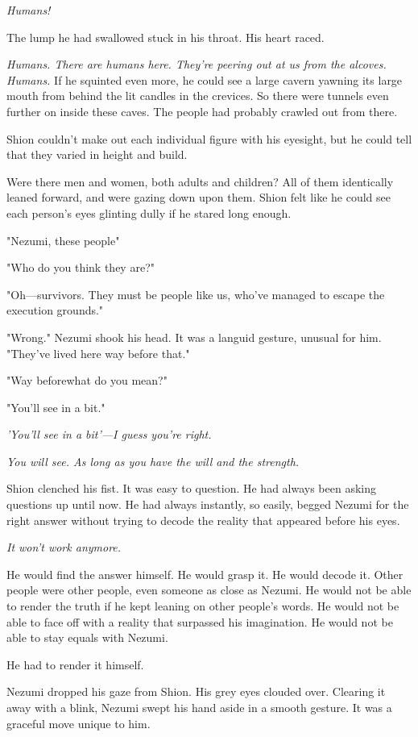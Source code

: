 \emph{Humans!}

The lump he had swallowed stuck in his throat. His heart raced.

\emph{Humans. There are humans here. They're peering out at us from the
alcoves. Humans.} If he squinted even more, he could see a large cavern
yawning its large mouth from behind the lit candles in the crevices. So
there were tunnels even further on inside these caves. The people had
probably crawled out from there.

Shion couldn't make out each individual figure with his eyesight, but he
could tell that they varied in height and build.

Were there men and women, both adults and children? All of them
identically leaned forward, and were gazing down upon them. Shion felt
like he could see each person's eyes glinting dully if he stared long
enough.

"Nezumi, these people\el "

"Who do you think they are?"

"Oh---survivors. They must be people like us, who've managed to escape the
execution grounds."

"Wrong." Nezumi shook his head. It was a languid gesture, unusual for
him. "They've lived here way before that."

"Way before\el what do you mean?"

"You'll see in a bit."

\emph{'You'll see in a bit'---I guess you're right.}

\emph{You will see. As long as you have the will and the strength.}

Shion clenched his fist. It was easy to question. He had always been
asking questions up until now. He had always instantly, so easily,
begged Nezumi for the right answer without trying to decode the reality
that appeared before his eyes.

\emph{It won't work anymore.}

He would find the answer himself. He would grasp it. He would decode it.
Other people were other people, even someone as close as Nezumi. He
would not be able to render the truth if he kept leaning on other
people's words. He would not be able to face off with a reality that
surpassed his imagination. He would not be able to stay equals with
Nezumi.

He had to render it himself.

Nezumi dropped his gaze from Shion. His grey eyes clouded over. Clearing
it away with a blink, Nezumi swept his hand aside in a smooth gesture.
It was a graceful move unique to him.

